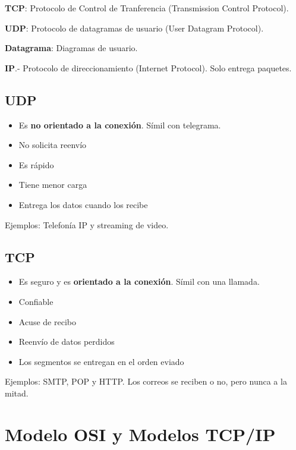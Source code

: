 \documentclass{article}
\begin{document}
\textbf{TCP}: Protocolo de Control de Tranferencia (Transmission Control Protocol).
\vspace{1em}

\textbf{UDP}: Protocolo de datagramas de usuario (User Datagram Protocol).
\vspace{1em}

\textbf{Datagrama}: Diagramas de usuario.
\vspace{1em}

\textbf{IP}.- Protocolo de direccionamiento (Internet Protocol). Solo entrega
paquetes.
\vspace{1em}

\subsection{UDP}

\begin{itemize}
	\item
	Es \textbf{no orientado a la conexión}. Símil con telegrama.
	\item
	No solicita reenvío
	\item
	Es rápido
	\item
	Tiene menor carga
	\item
	Entrega los datos cuando los recibe
\end{itemize}
\vspace{1em}

Ejemplos: Telefonía IP y streaming de video.

\subsection{TCP}

\begin{itemize}
	\item
	Es seguro y es \textbf{orientado a la conexión}. Símil con una llamada.
	\item
	Confiable
	\item
	Acuse de recibo
	\item
	Reenvío de datos perdidos
	\item
	Los segmentos se entregan en el orden eviado
\end{itemize}
\vspace{1em}

Ejemplos: SMTP, POP y HTTP. Los correos se reciben o no, pero nunca a la mitad.

\section{Modelo OSI y Modelos TCP/IP}
\end{document}
